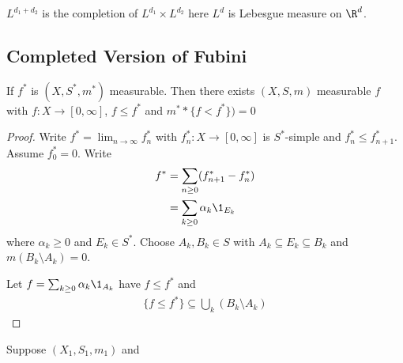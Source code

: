 \begin{corollary}
	$L^{d_1 + d_2}$ is the completion of $L^{d_1} \times L^{d_2}$ here $L^d$ is Lebesgue measure on $\R^d$.
\end{corollary}

\subsection{Completed Version of Fubini}

\begin{lemma} If $f^*$ is  $(X, S^*, m^*)$ measurable. 
	Then there exists $(X, S, m)$ measurable $f$ with $f: X \to [0,\infty]$, $f \leq f^*$ and $m^* * \{f < f^* \}) = 0$
\end{lemma}

\begin{proof}
	Write $f^* = \lim_{n \to \infty} f_n^*$ with $f_{n}^* : X \to [0, \infty]$ is $S^*$-simple and 
	$f_n^* \leq f_{n+1}^*$.
	Assume $f_{0}^* = 0$. Write
	\begin{align*}
		f^* &= \sum_{n \geq 0} (f_{n+1}^* - f_n^*) \\
			&= \sum_{k \geq 0} \alpha_{k} \1_{E_k}
	\end{align*}
	where $\alpha_k \geq 0$ and $E_k \in S^*$. Choose $A_k, B_k \in S$ with $A_k \subseteq E_k \subseteq B_k$ and
	$m(B_k \setminus A_k) = 0$.

	Let $f = \sum_{k \geq 0} \alpha_{k} \1_{A_k}$ have $f \leq f^*$ and
	\begin{align*}
		\{ f \leq f^* \} \subseteq \bigcup_{k} (B_{k} \setminus A_k)
	\end{align*} 
\end{proof}

\begin{theorem}
	Suppose $(X_1, S_1, m_1)$ and
\end{theorem}

